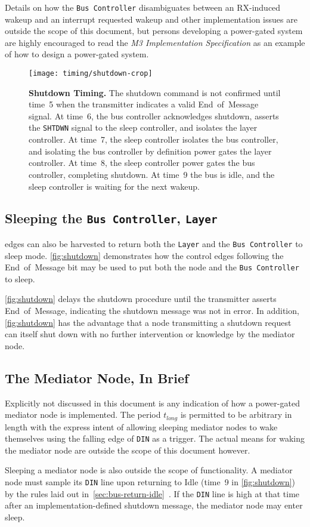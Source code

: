 Details on how the {\tt Bus~Controller} disambiguates between an RX-induced
wakeup and an interrupt requested wakeup and other implementation issues are
outside the scope of this document, but persons developing a power-gated
system are highly encouraged to read the {\em \bus M3 Implementation
Specification} as an example of how to design a power-gated system.

\begin{figure}[t]
  \centering
  \texttt{[image: timing/shutdown-crop]}
  \caption{\textbf{Shutdown Timing.} \textmd{
    The shutdown command is not confirmed until time~5 when the transmitter
    indicates a valid End~of~Message signal. At time~6, the bus controller
    acknowledges shutdown, asserts the {\tt SHTDWN} signal to the sleep
    controller, and isolates the layer controller. At time~7, the sleep
    controller isolates the bus controller, and isolating the bus controller
    by definition power gates the layer controller. At time~8, the sleep
    controller power gates the bus controller, completing shutdown. At time~9
    the bus is idle, and the sleep controller is waiting for the next wakeup.
  }}
  \label{fig:shutdown}
\end{figure}

\subsection{Sleeping the {\tt Bus Controller}, {\tt Layer}}
\bus edges can also be harvested to return both the {\tt Layer} and the
{\tt Bus~Controller} to sleep mode. \autoref{fig:shutdown} demonstrates how
the control edges following the End~of~Message bit may be used to put both the
node and the {\tt Bus~Controller} to sleep.

\autoref{fig:shutdown} delays the shutdown procedure until the transmitter
asserts End~of~Message, indicating the shutdown message was not in error.
In addition, \autoref{fig:shutdown} has the advantage that a node transmitting
a shutdown request can itself shut down with no further intervention or
knowledge by the mediator node.

\subsection{The Mediator Node, In Brief}
Explicitly not discussed in this document is any indication of how a
power-gated mediator node is implemented. The period $t_{long}$ is permitted to
be arbitrary in length with the express intent of allowing sleeping mediator
nodes to wake themselves using the falling edge of {\tt DIN} as a trigger. The
actual means for waking the mediator node are outside the scope of this
document however.

Sleeping a mediator node is also outside the scope of \bus functionality.
A mediator node must sample its {\tt DIN} line upon returning to Idle (time~9
in \autoref{fig:shutdown}) by the rules laid out
in~\ref{sec:bus-return-idle}~. If the
{\tt DIN} line is high at that time after an implementation-defined shutdown
message, the mediator node may enter sleep.
